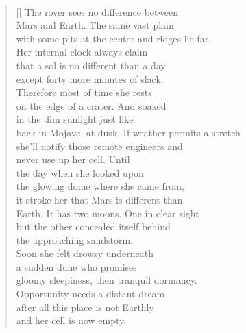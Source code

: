 \documentclass{book}
\begin{document}
\newpage
\renewcommand{\poemtitlefont}{\normalfont\large\itshape\centering}
\poemtitle{\textcolor[RGB]{165,15,15}{Opportunity's mission}}
\hspace*{\fill} \\
\settowidth{\versewidth}{back in Mojave, at dusk. If weather permits a stretch}
\begin{verse}[\versewidth]
    The rover sees no difference between\\
    Mars and Earth. The same vast plain\\
    with some pits at the center and ridges lie far. \\
    Her internal clock always claim\\
    that a sol is no different than a day\\
    except forty more minutes of slack.\\
    Therefore most of time she rests\\
    on the edge of a crater. And soaked\\
    in the dim sunlight just like\\
    back in Mojave, at dusk. If weather permits a stretch \\
    she'll notify those remote engineers and\\
    never use up her cell. Until\\
    the day when she looked upon\\
    the glowing dome where she came from,\\
    it stroke her that Mars is different than\\
    Earth. It has two moons. One in clear sight\\
    but the other concealed itself behind\\
    the approaching sandstorm.\\
    Soon she felt drowsy underneath\\
    a sudden dune who promises\\
    gloomy sleepiness, then tranquil dormancy.\\
    Opportunity needs a distant dream\\
    after all this place is not Earthly\\
    and her cell is now empty.\\
\end{verse}

\newpage
\end{document}
